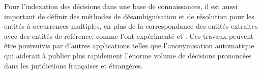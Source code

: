 Pour l'indexation des décisions dans une base de connaissances, il est aussi important de définir des méthodes de désambiguïsation et de résolution pour les entités à occurrences multiples, en plus de la correspondance des entités extraites avec des entités de référence, comme l'ont expérimenté \citet{dozier2010legalnerr} et \citet{cardellino2017legalNERCL}. Ces travaux peuvent être poursuivis par d'autres applications telles que l'anonymisation automatique qui aiderait à publier plus rapidement l'énorme volume de décisions prononcées dans les juridictions françaises et étrangères.